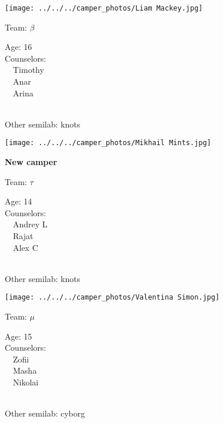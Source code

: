 \documentclass[10pt,letterpaper, landscape]{article}
\begin{document}
\horizontalshiftfornextsticker
\renewcommand{\baselinestretch}{1} \begin{sticker}
\noindent\begin{minipage}{0.5\textwidth}\texttt{[image: ../../../camper\_photos/Liam Mackey.jpg]}\end{minipage}\begin{minipage}{0.45\textwidth}
Team: {\Large $\beta$}

Age:        16\\
Counselors: \\\ \ Timothy\\\ \ Anar\\\ \ Arina\\
\end{minipage} \\ \vspace{0.07in}
Other semilab: knots
\end{sticker}
\horizontalshiftfornextsticker
\renewcommand{\baselinestretch}{1} \begin{sticker}
\noindent\begin{minipage}{0.5\textwidth}\texttt{[image: ../../../camper\_photos/Mikhail Mints.jpg]}\end{minipage}\begin{minipage}{0.45\textwidth}
\textbf{New camper} 

Team: {\Large $\tau$}

Age:        14\\
Counselors: \\\ \ Andrey L\\\ \ Rajat\\\ \ Alex C\\
\end{minipage} \\ \vspace{0.07in}
Other semilab: knots
\end{sticker}
\verticalshiftfornextsticker
\renewcommand{\baselinestretch}{1} \begin{sticker}
\noindent\begin{minipage}{0.5\textwidth}\texttt{[image: ../../../camper\_photos/Valentina Simon.jpg]}\end{minipage}\begin{minipage}{0.45\textwidth}
Team: {\Large $\mu$}

Age:        15\\
Counselors: \\\ \ Zofii\\\ \ Masha\\\ \ Nikolai\\
\end{minipage} \\ \vspace{0.07in}
Other semilab: cyborg
\end{sticker}
\end{document}
